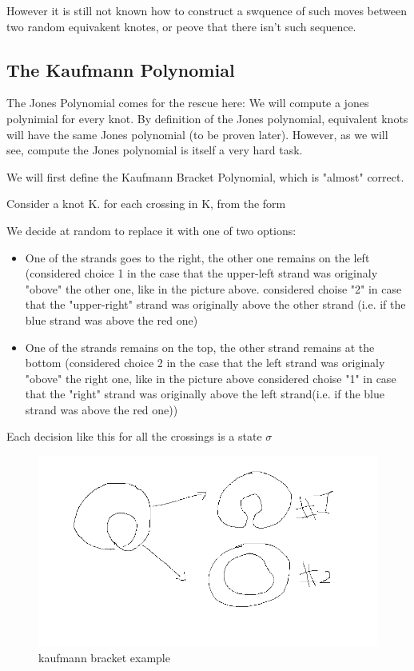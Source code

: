 \documentclass{article}
\begin{document}
However it is still not known how to construct a swquence of such moves between two random equivakent knotes, or peove that there isn't such sequence.

\subsection{The Kaufmann Polynomial}
The Jones Polynomial comes for the rescue here: We will compute a jones polynimial for every knot. By definition of the Jones polynomial, equivalent knots will have the same Jones polynomial (to be proven later). However, as we will see, compute the Jones polynomial is itself a very hard task.

  We will first define the Kaufmann Bracket Polynomial, which is "almost" correct.

Consider a knot K. for each crossing in K, from the form 
\begin{center}
\end{center} 

We decide at random to replace it with one of two options:
\begin{itemize}
\item One of the strands goes to the right, the other one remains on the left (considered choice 1 in the case that the upper-left strand was originaly "obove" the other one, like in the picture above. considered choise "2" in case that the "upper-right" strand was originally above the other strand (i.e. if the blue strand was above the red one)
\item One of the strands remains on the top, the other strand remains at the bottom (considered choice 2 in the case that the left strand was originaly "obove" the right one,  like in the picture above considered choise "1" in case that the "right" strand was originally above the left strand(i.e. if the blue strand was above the red one))
\end{itemize}
Each decision like this for all the crossings is a state \(\sigma\)

\begin{figure}
\includegraphics[scale=0.2]{kauffman_calc} 
\caption{kaufmann bracket example}
\end{figure}
\end{document}
